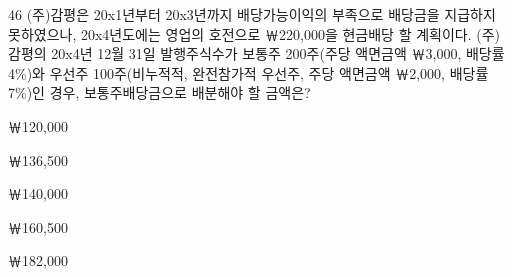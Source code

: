\begin{question}{46}
(주)감평은 20x1년부터 20x3년까지 배당가능이익의 부족으로 배당금을 지급하지 못하였으나, 20x4년도에는 영업의 호전으로 ￦220,000을 현금배당 할 계획이다. (주)감평의 20x4년 12월 31일 발행주식수가 보통주 200주(주당 액면금액 ￦3,000, 배당률 4\%)와 우선주 100주(비누적적, 완전참가적 우선주, 주당 액면금액 ￦2,000, 배당률 7\%)인 경우, 보통주배당금으로 배분해야 할 금액은?
\begin{choices}
  \item ￦120,000
  \item ￦136,500
  \item ￦140,000
  \item ￦160,500
  \item ￦182,000
\end{choices}
\end{question}
